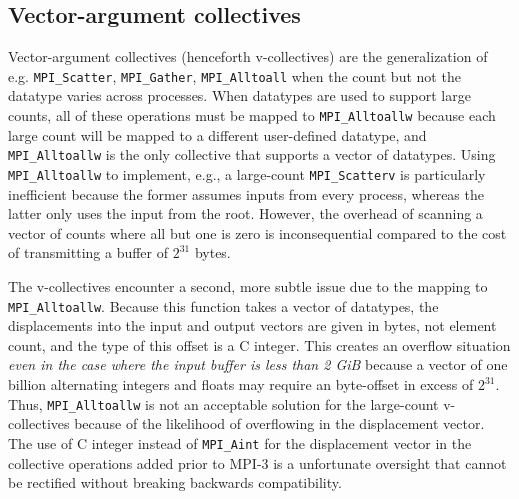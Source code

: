 
\subsection{Vector-argument collectives}

Vector-argument collectives (henceforth v-collectives) are the generalization of 
e.g. \texttt{MPI\_Scatter}, \texttt{MPI\_Gather}, \texttt{MPI\_Alltoall}
when the count but not the datatype varies across processes.
When datatypes are used to support large counts, all of these operations must be
mapped to \texttt{MPI\_Alltoallw} because each large count will be mapped
to a different user-defined datatype, and \texttt{MPI\_Alltoallw} is the only collective
that supports a vector of datatypes.
Using \texttt{MPI\_Alltoallw} to implement, e.g., a large-count \texttt{MPI\_Scatterv} is
particularly inefficient because the former assumes inputs from every process,
whereas the latter only uses the input from the root.
However, the overhead of scanning a vector of counts where all but one is zero
is inconsequential compared to the cost of transmitting a buffer of $2^{31}$ bytes.


The v-collectives encounter a second, more subtle issue due to the mapping to
\texttt{MPI\_Alltoallw}.  Because this function takes a vector of datatypes, the
displacements into the input and output vectors are given in bytes,
not element count, and the type of this offset is a C integer.
This creates an overflow situation \textit{even in the case
where the input buffer is less than 2 GiB} because a vector of one billion
alternating integers and floats may require an byte-offset in excess of $2^{31}$.
Thus, \texttt{MPI\_Alltoallw} is not an acceptable solution for the large-count
v-collectives because of the likelihood of overflowing in the displacement vector.
The use of C integer instead of \texttt{MPI\_Aint} for the displacement vector in
the  collective operations added prior to MPI-3 is a unfortunate oversight that
cannot be rectified without breaking backwards compatibility.


